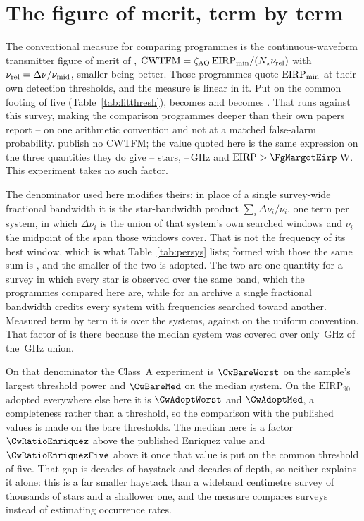 \section{The figure of merit, term by term}
\label{app:cwtfm}

The conventional measure for comparing programmes is the continuous-waveform
transmitter figure of merit of \citet{Enriquez2017},
$\mathrm{CWTFM}=\zeta_{\rm AO}\,\mathrm{EIRP}_{\rm min}/
(N_{\star}\nu_{\rm rel})$ with $\nu_{\rm rel}=\Delta\nu/\nu_{\rm mid}$,
smaller being better. Those programmes quote $\mathrm{EIRP}_{\rm min}$ at
their own detection thresholds, and the measure is linear in it. Put on the
common footing of five (Table~\ref{tab:litthresh}), \FomLitEnriquez{} becomes
\FomLitEnriquezFive{} and \FgLitMargot{} becomes \FgLitMargotFive. That runs
against this survey, making the comparison programmes deeper than their own
papers report -- on one arithmetic convention and not
at a matched false-alarm probability. \citet{Margot2023} publish no
CWTFM; the value quoted here is the same expression on the three quantities
they do give -- \FomMargotN{} stars, \FomMargotLo--\FomMargotHi\,GHz and
$\mathrm{EIRP}>\FgMargotEirp$\,W. This experiment takes no such factor.

The denominator used here modifies theirs: in place of a single survey-wide
fractional bandwidth it is the star-bandwidth product
$\sum_{i}\Delta\nu_{i}/\nu_{i}$, one term per system, in which
$\Delta\nu_{i}$ is the union of that system's own searched windows and
$\nu_{i}$ the midpoint of the span those windows cover. That is not the
frequency of its best window, which is
what Table~\ref{tab:persys} lists; formed with those the same sum is
\CwSigmaBest, and the smaller of the two is adopted. The two are one quantity
for a survey in which every star is observed over the same band, which the
programmes compared here are, while for an archive a single fractional
bandwidth credits every system with frequencies searched toward another.
Measured term by term it is \CwSigma{} over the \CwNSys{} systems, against
\CwUniform{} on the uniform convention. That factor of \CwRatio{} is there
because the median system was covered over only \SysUnionAMed\,GHz of the
\CvUnionA\,GHz union.

On that denominator the Class~A experiment is
$\CwBareWorst$ on the sample's largest threshold power and $\CwBareMed$ on
the median system. On the $\mathrm{EIRP}_{90}$ adopted everywhere else here
it is $\CwAdoptWorst$ and $\CwAdoptMed$, a completeness rather than a
threshold, so the comparison with the published values is made on the bare
thresholds. The median here is a factor $\CwRatioEnriquez$ above the
published Enriquez value and $\CwRatioEnriquezFive$ above it once that value
is put on the common threshold of five. That
gap is \CwBandDex{} decades of haystack and \CwEirpDex{} decades of depth, so
neither explains it alone: this is a far smaller haystack than a wideband
centimetre survey of thousands of stars and a shallower one, and the measure
compares surveys instead of estimating occurrence rates.
